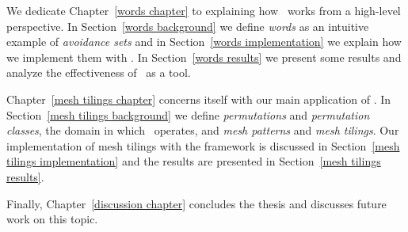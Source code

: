 We dedicate Chapter~\ref{words chapter} to explaining how \CombCov\ works from a 
high-level perspective. In Section~\ref{words background} we define \emph{words}
as an intuitive example of \emph{avoidance sets} and in Section~\ref{words 
implementation} we explain how we implement them with \CombCov. In 
Section~\ref{words results} we present some results and analyze the 
effectiveness of \CombCov\ as a tool.

Chapter~\ref{mesh tilings chapter} concerns itself with our main application of 
\CombCov. In Section~\ref{mesh tilings background} we define \emph{permutations}
and \emph{permutation classes}, the domain in which \Struct\ operates, and 
\emph{mesh patterns} and \emph{mesh tilings}. Our implementation of mesh tilings
with  the framework is discussed in Section~\ref{mesh tilings implementation} 
and the results are presented in Section~\ref{mesh tilings results}.

Finally, Chapter~\ref{discussion chapter} concludes the thesis and discusses 
future work on this topic.

